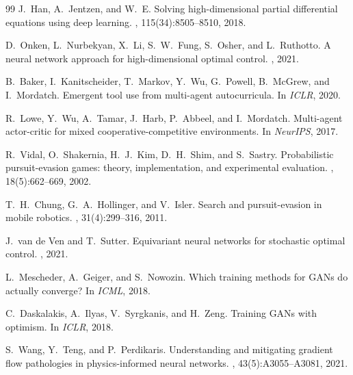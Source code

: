 \documentclass[11pt]{article}
\begin{document}
\begin{thebibliography}{99}
J.~Han, A.~Jentzen, and W.~E.
\newblock Solving high-dimensional partial differential equations using
deep learning.
, 115(34):8505--8510, 2018.

D.~Onken, L.~Nurbekyan, X.~Li, S.~W.~Fung, S.~Osher, and L.~Ruthotto.
\newblock A neural network approach for high-dimensional optimal control.
, 2021.

B.~Baker, I.~Kanitscheider, T.~Markov, Y.~Wu, G.~Powell, B.~McGrew, and
I.~Mordatch.
\newblock Emergent tool use from multi-agent autocurricula.
\newblock In {\em ICLR}, 2020.

R.~Lowe, Y.~Wu, A.~Tamar, J.~Harb, P.~Abbeel, and I.~Mordatch.
\newblock Multi-agent actor-critic for mixed cooperative-competitive
environments.
\newblock In {\em NeurIPS}, 2017.

R.~Vidal, O.~Shakernia, H.~J.~Kim, D.~H.~Shim, and S.~Sastry.
\newblock Probabilistic pursuit-evasion games: theory, implementation,
and experimental evaluation.
, 18(5):662--669, 2002.

T.~H.~Chung, G.~A.~Hollinger, and V.~Isler.
\newblock Search and pursuit-evasion in mobile robotics.
, 31(4):299--316, 2011.

J.~van de Ven and T.~Sutter.
\newblock Equivariant neural networks for stochastic optimal control.
, 2021.

L.~Mescheder, A.~Geiger, and S.~Nowozin.
\newblock Which training methods for GANs do actually converge?
\newblock In {\em ICML}, 2018.

C.~Daskalakis, A.~Ilyas, V.~Syrgkanis, and H.~Zeng.
\newblock Training GANs with optimism.
\newblock In {\em ICLR}, 2018.

S.~Wang, Y.~Teng, and P.~Perdikaris.
\newblock Understanding and mitigating gradient flow pathologies in
physics-informed neural networks.
, 43(5):A3055--A3081, 2021.

\end{thebibliography}
\end{document}
